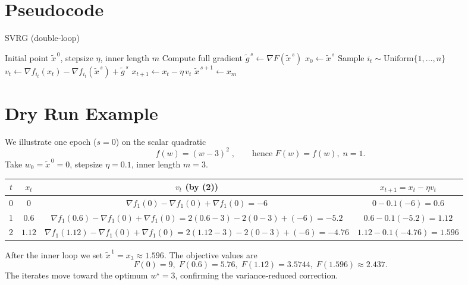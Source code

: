 \documentclass[11pt]{article}
\begin{document}
\section*{Pseudocode}
\begin{algorithm}[H]
\caption{SVRG (double‑loop)}\label{alg:svrg}
\begin{algorithmic}[1]
\Require Initial point $\tilde{x}^{\,0}$, stepsize $\eta$, inner length $m$
    \State Compute full gradient $\tilde{g}^{\,s}\gets \nabla F(\tilde{x}^{\,s})$ 
    \State $x_0\gets \tilde{x}^{\,s}$
        \State Sample $i_t\sim\text{Uniform}\{1,\dots,n\}$
        \State $v_t\gets \nabla f_{i_t}(x_t)-\nabla f_{i_t}(\tilde{x}^{\,s})+\tilde{g}^{\,s}$ 
        \State $x_{t+1}\gets x_t-\eta\,v_t$ 
    \EndFor
    \State $\tilde{x}^{\,s+1}\gets x_m$ 
\EndFor
\end{algorithmic}
\end{algorithm}

\section*{Dry Run Example}
We illustrate one epoch ($s=0$) on the scalar quadratic
\[
f(w)=(w-3)^2\;,
\qquad\text{hence }F(w)=f(w),\;n=1.
\]
Take $w_0=\tilde{x}^{\,0}=0$, stepsize $\eta=0.1$, inner length $m=3$.

\begin{center}
\begin{tabular}{c|c|c|c}
$t$ & $x_t$ & $v_t$ (by (2)) & $x_{t+1}=x_t-\eta v_t$ \\ \hline
0 & $0$ & $\nabla f_1(0)-\nabla f_1(0)+\nabla f_1(0)= -6$ & $0-0.1(-6)=0.6$ \\
1 & $0.6$ & $\nabla f_1(0.6)-\nabla f_1(0)+\nabla f_1(0)
      =2(0.6-3)-2(0-3)+(-6)= -5.2$ & $0.6-0.1(-5.2)=1.12$ \\
2 & $1.12$ & $\nabla f_1(1.12)-\nabla f_1(0)+\nabla f_1(0)
      =2(1.12-3)-2(0-3)+(-6)= -4.76$ & $1.12-0.1(-4.76)=1.596$ 
\end{tabular}
\end{center}
After the inner loop we set $\tilde{x}^{\,1}=x_3\approx 1.596$.
The objective values are
\[
F(0)=9,\;F(0.6)=5.76,\;F(1.12)=3.5744,\;F(1.596)\approx2.437.
\]
The iterates move toward the optimum $w^\star=3$, confirming the variance‑reduced correction.

\end{document}
